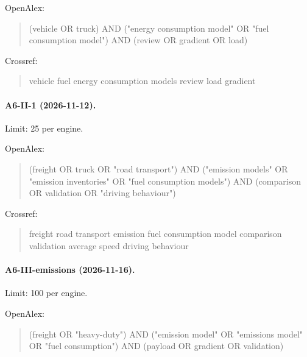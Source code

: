\noindent OpenAlex:

\begin{quote}\footnotesize\ttfamily\raggedright

(vehicle OR truck) AND ("energy consumption model" OR "fuel consumption model") AND (review OR gradient OR load)

\end{quote}

\noindent Crossref:

\begin{quote}\footnotesize\ttfamily\raggedright

vehicle fuel energy consumption models review load gradient

\end{quote}

\paragraph{A6-II-1 (2026-11-12).} Limit: 25 per engine.

\noindent OpenAlex:

\begin{quote}\footnotesize\ttfamily\raggedright

(freight OR truck OR "road transport") AND ("emission models" OR "emission inventories" OR "fuel consumption models") AND (comparison OR validation OR "driving behaviour")

\end{quote}

\noindent Crossref:

\begin{quote}\footnotesize\ttfamily\raggedright

freight road transport emission fuel consumption model comparison validation average speed driving behaviour

\end{quote}

\paragraph{A6-III-emissions (2026-11-16).} Limit: 100 per engine.

\noindent OpenAlex:

\begin{quote}\footnotesize\ttfamily\raggedright

(freight OR "heavy-duty") AND ("emission model" OR "emissions model" OR "fuel consumption") AND (payload OR gradient OR validation)

\end{quote}

